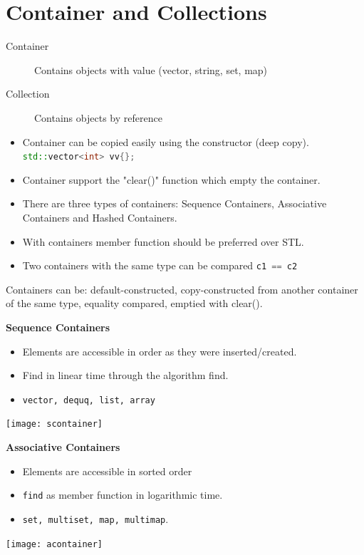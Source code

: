 \section{Container and Collections}
\begin{description}
  \item[Container] Contains objects with value (vector, string, set, map)
  \item[Collection] Contains objects by reference
\end{description}

\begin{itemize}
  \itemsep -0.5em 
  \item Container can be copied easily using the constructor (deep copy). \lstinline[language=C++]|std::vector<int> vv{};|
  \item Container support the "clear()" function which empty the container.
  \item There are three types of containers: Sequence Containers, Associative Containers and Hashed Containers.
  \item With containers member function should be preferred over STL.
  \item Two containers with the same type can be compared \lstinline[language=C++]|c1 == c2|
\end{itemize}

Containers can be: default-constructed, copy-constructed from another container of the same type, equality compared, emptied with clear().

\begin{minipage}{0,5\linewidth}
	\textbf{Sequence Containers}
	\begin{itemize}
		\item Elements are accessible in order as they were inserted/created.
		\item Find in linear time through the algorithm find.
		\item \lstinline|vector, dequq, list, array|
	\end{itemize}
	 
\end{minipage}
\begin{minipage}{0,5\linewidth}
	\center
	\texttt{[image: scontainer]}  
\end{minipage}

\begin{minipage}{0,5\linewidth}
	\textbf{Associative Containers}
	\begin{itemize}
		\item Elements are accessible in sorted order
		\item \lstinline|find| as member function in logarithmic time.
		\item \lstinline|set, multiset, map, multimap|.
	\end{itemize} 
\end{minipage}
\begin{minipage}{0,5\linewidth}
	\center
	\texttt{[image: acontainer]}  
\end{minipage}

